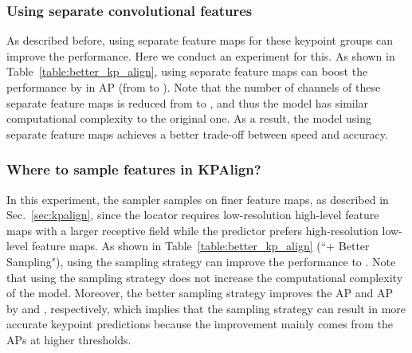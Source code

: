 \documentclass[10pt,twocolumn,letterpaper]{article}
\newcommand{\1}{{\mathbbm{1}}}
\begin{document}
{\subsubsection{Using separate convolutional features}
As described before, using separate feature maps for these keypoint groups can improve the performance. Here we conduct an experiment for this. As shown in Table~\ref{table:better_kp_align}, using separate feature maps can boost the performance by  in AP (from  to ). Note that the number of channels of these separate feature maps is reduced from  to , and thus the model has similar computational complexity to the original one. As a result, the model using separate feature maps achieves a better trade-off between speed and accuracy.

\subsubsection{Where to sample features in KPAlign?}
In this experiment, the sampler samples on finer feature maps, as described in Sec.~\ref{sec:kpalign}, since the locator requires low-resolution high-level feature maps with a larger receptive field while the predictor prefers high-resolution low-level feature maps. As shown in Table~\ref{table:better_kp_align} (``+ Better Sampling"), using the sampling strategy can improve the performance to . Note that using the sampling strategy does not increase the computational complexity of the model. Moreover, the better sampling strategy improves the AP and AP by  and , respectively, which implies that the sampling strategy can result in more accurate keypoint predictions because the improvement mainly comes from the APs at higher thresholds.
}
\end{document}
